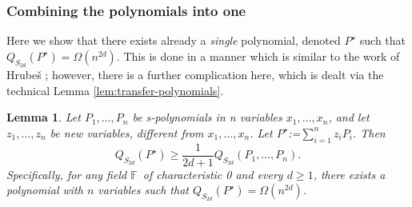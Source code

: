 \documentclass[12pt,reqno]{article}
\newtheorem{lemma}[theorem]{Lemma}
\renewcommand{\dot}[1]{{#1}^\star}
\newcommand\F{\ensuremath{\mathbb F}}
\newcommand{\nx}[1]{#1_1,\ldots,#1_{n}}
\begin{document}
\subsubsection{Combining the polynomials into one}

Here we show that there exists already a \textit{single}
polynomial, denoted $\dot{P}$   such that $Q_{S_{2d}}(\dot{P})=\Omega(n^{2d})$. This is done in a manner which is  similar to the work of Hrube\v s \cite{Hru11}; however, there is a further complication here, which is dealt via the technical Lemma \ref{lem:transfer-polynomials}.



 \begin{lemma}
\label{lem:combine_into_one}
Let $\nx{P}$ be s-polynomials in n variables $\nx{x}$, and  let $\nx{z}$ be new variables,  different from $\nx{x}$. Let $\dot{P}$:=$\sum_{i=1}^n z_iP_i$. Then
\begin{equation}\label{eq:count_constant_of_dimension_2}
  Q_{S_{2d}}(\dot{P})\geq\frac{1}{2d+1}Q_{S_{2d}}(\nx{P}).
\end{equation}
Specifically, for any field \F\ of characteristic 0 and every $d\ge 1$, there exists a polynomial with $n$ variables such that
$Q_{S_{2d}}(\dot{P})=\Omega(n^{2d})$.
\end{lemma}
\end{document}
